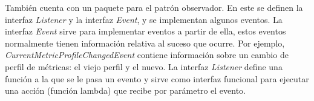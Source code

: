 También cuenta con un paquete para el patrón observador. En este se definen la interfaz \textit{Listener} y la interfaz \textit{Event}, y se implementan algunos eventos. La interfaz \textit{Event} sirve para implementar eventos a partir de ella, estos eventos normalmente tienen información relativa al suceso que ocurre. Por ejemplo, \textit{CurrentMetricProfileChangedEvent} contiene información sobre un cambio de perfil de métricas: el viejo perfil y el nuevo. La interfaz \textit{Listener} define una función a la que se le pasa un evento y sirve como interfaz funcional para ejecutar una acción (función lambda) que recibe por parámetro el evento.
